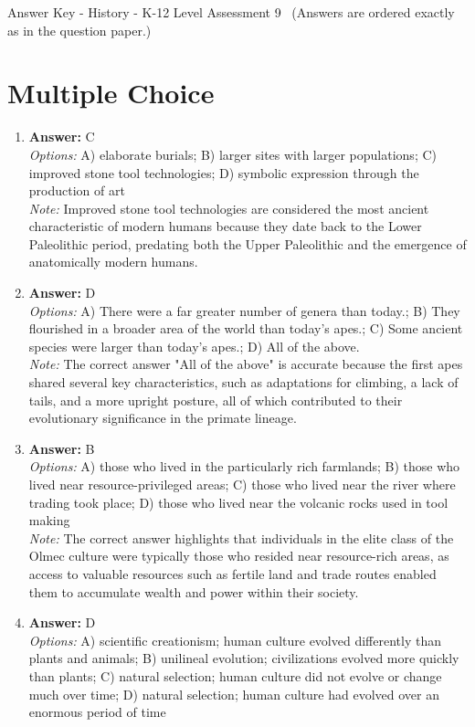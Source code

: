 \documentclass[12pt]{article}
\begin{document}
\begin{center}
Answer Key - History - K-12 Level Assessment 9 \
\small (Answers are ordered exactly as in the question paper.)
\end{center}

\section*{Multiple Choice}
\begin{enumerate}[label=\arabic*.]
\item \textbf{Answer:} C
\\ \textit{Options:} A) elaborate burials; B) larger sites with larger populations; C) improved stone tool technologies; D) symbolic expression through the production of art
\\ \textit{Note:} Improved stone tool technologies are considered the most ancient characteristic of modern humans because they date back to the Lower Paleolithic period, predating both the Upper Paleolithic and the emergence of anatomically modern humans.
\item \textbf{Answer:} D
\\ \textit{Options:} A) There were a far greater number of genera than today.; B) They flourished in a broader area of the world than today's apes.; C) Some ancient species were larger than today's apes.; D) All of the above.
\\ \textit{Note:} The correct answer "All of the above" is accurate because the first apes shared several key characteristics, such as adaptations for climbing, a lack of tails, and a more upright posture, all of which contributed to their evolutionary significance in the primate lineage.
\item \textbf{Answer:} B
\\ \textit{Options:} A) those who lived in the particularly rich farmlands; B) those who lived near resource-privileged areas; C) those who lived near the river where trading took place; D) those who lived near the volcanic rocks used in tool making
\\ \textit{Note:} The correct answer highlights that individuals in the elite class of the Olmec culture were typically those who resided near resource-rich areas, as access to valuable resources such as fertile land and trade routes enabled them to accumulate wealth and power within their society.
\item \textbf{Answer:} D
\\ \textit{Options:} A) scientific creationism; human culture evolved differently than plants and animals; B) unilineal evolution; civilizations evolved more quickly than plants; C) natural selection; human culture did not evolve or change much over time; D) natural selection; human culture had evolved over an enormous period of time

\end{enumerate}
\end{document}
